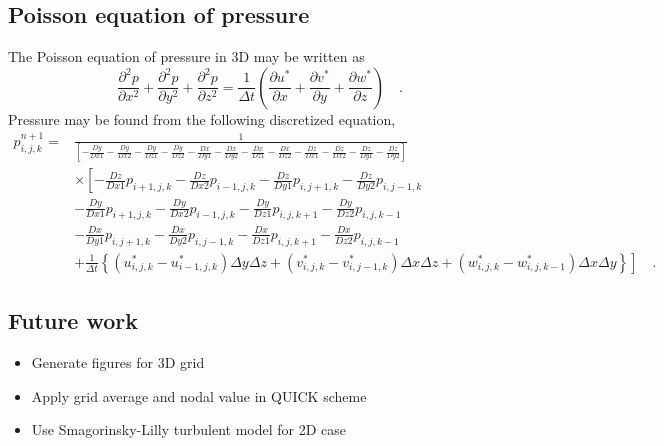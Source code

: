 \documentclass[12pt,a4paper,fleqn]{article}
\begin{document}
\subsection{Poisson equation of pressure}
The Poisson equation of pressure in 3D may be written as
\begin{equation} \label{eq:3D-poisson-components}
\frac{\partial^2 p}{\partial x^2} + \frac{\partial^2 p}{\partial y^2} + \frac{\partial^2 p}{\partial z^2}
= \frac{1}{\Delta t} \left(\frac{\partial u^*}{\partial x} + \frac{\partial v^*}{\partial y} + \frac{\partial w^*}{\partial z}\right) \quad.
\end{equation}
Pressure may be found from the following discretized equation,
\begin{align}
p_{i,j,k}^{n+1} =
&\frac{1}{\left[ - \frac{Dy}{Dx1} - \frac{Dy}{Dx2} - \frac{Dy}{Dz1}- \frac{Dy}{Dz2} - \frac{Dx}{Dy1} - \frac{Dx}{Dy2} - \frac{Dx}{Dz1} - \frac{Dx}{Dz2} - \frac{Dz}{Dx1} - \frac{Dz}{Dx2} - \frac{Dz}{Dy1} - \frac{Dz}{Dy2}\right]}
\nonumber \\
&\times
\left[
- \frac{Dz}{Dx1}p_{i+1,j,k} - \frac{Dz}{Dx2}p_{i-1,j,k} - \frac{Dz}{Dy1}p_{i,j+1,k} - \frac{Dz}{Dy2}p_{i,j-1,k} \right.
\nonumber \\
&- \frac{Dy}{Dx1}p_{i+1,j,k} - \frac{Dy}{Dx2}p_{i-1,j,k} - \frac{Dy}{Dz1}p_{i,j,k+1} - \frac{Dy}{Dz2}p_{i,j,k-1}
\nonumber \\
&- \frac{Dx}{Dy1}p_{i,j+1,k} - \frac{Dx}{Dy2}p_{i,j-1,k} - \frac{Dx}{Dz1}p_{i,j,k+1} - \frac{Dx}{Dz2}p_{i,j,k-1}
\nonumber \\
&\left.
+ \frac{1}{\Delta t}\left\{
\left(u^*_{i,j,k}-u^*_{i-1,j,k}\right) \Delta y \Delta z
+ \left(v^*_{i,j,k}-v^*_{i,j-1,k}\right) \Delta x \Delta z
+ \left(w^*_{i,j,k}-w^*_{i,j,k-1}\right) \Delta x \Delta y
\right\}
\right]
\quad .
\end{align}


\subsection{Future work}
\begin{itemize}
\item Generate figures for 3D grid
\item Apply grid average and nodal value in QUICK scheme
\item Use Smagorinsky-Lilly turbulent model for 2D case
\end{itemize}
\end{document}
